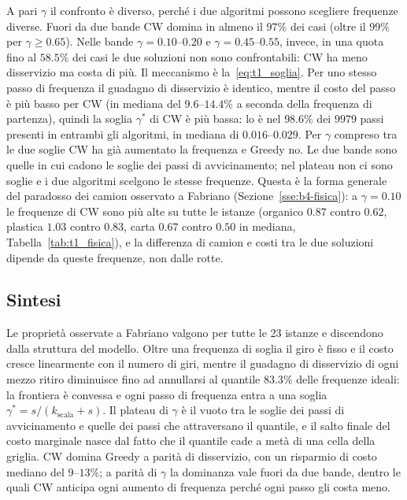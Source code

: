 A pari $\gamma$ il confronto è diverso, perché i due algoritmi possono scegliere frequenze diverse. Fuori da due bande CW domina in almeno il $97\%$ dei casi (oltre il $99\%$ per $\gamma\ge0.65$). Nelle bande $\gamma=0.10$--$0.20$ e $\gamma=0.45$--$0.55$, invece, in una quota fino al $58.5\%$ dei casi le due soluzioni non sono confrontabili: CW ha meno disservizio ma costa di più. Il meccanismo è la~\eqref{eq:t1_soglia}. Per uno stesso passo di frequenza il guadagno di disservizio è identico, mentre il costo del passo è più basso per CW (in mediana del $9.6$--$14.4\%$ a seconda della frequenza di partenza), quindi la soglia $\gamma^*$ di CW è più bassa: lo è nel $98.6\%$ dei $9979$ passi presenti in entrambi gli algoritmi, in mediana di $0.016$--$0.029$. Per $\gamma$ compreso tra le due soglie CW ha già aumentato la frequenza e Greedy no. Le due bande sono quelle in cui cadono le soglie dei passi di avvicinamento; nel plateau non ci sono soglie e i due algoritmi scelgono le stesse frequenze. Questa è la forma generale del paradosso dei camion osservato a Fabriano (Sezione~\ref{sse:b4-fisica}): a $\gamma=0.10$ le frequenze di CW sono più alte su tutte le istanze (organico $0.87$ contro $0.62$, plastica $1.03$ contro $0.83$, carta $0.67$ contro $0.50$ in mediana, Tabella~\ref{tab:t1_fisica}), e la differenza di camion e costi tra le due soluzioni dipende da queste frequenze, non dalle rotte.

\subsection{Sintesi}\label{sse:t1-sintesi}

Le proprietà osservate a Fabriano valgono per tutte le 23 istanze e discendono dalla struttura del modello. Oltre una frequenza di soglia il giro è fisso e il costo cresce linearmente con il numero di giri, mentre il guadagno di disservizio di ogni mezzo ritiro diminuisce fino ad annullarsi al quantile $83.3\%$ delle frequenze ideali: la frontiera è convessa e ogni passo di frequenza entra a una soglia $\gamma^*=s/(k_{\mathrm{scala}}+s)$. Il plateau di $\gamma$ è il vuoto tra le soglie dei passi di avvicinamento e quelle dei passi che attraversano il quantile, e il salto finale del costo marginale nasce dal fatto che il quantile cade a metà di una cella della griglia. CW domina Greedy a parità di disservizio, con un risparmio di costo mediano del $9$--$13\%$; a parità di $\gamma$ la dominanza vale fuori da due bande, dentro le quali CW anticipa ogni aumento di frequenza perché ogni passo gli costa meno.

